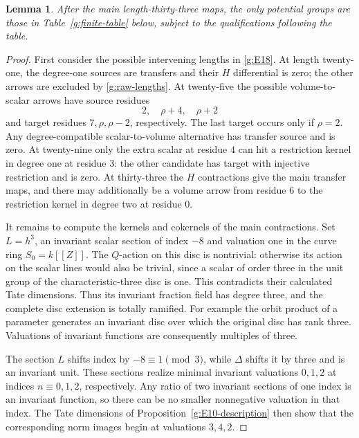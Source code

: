 \documentclass[11pt]{article}
\newtheorem{lemma}[theorem]{Lemma}
\theoremstyle{definition}
\theoremstyle{remark}
\numberwithin{equation}{section}
\begin{document}
\begin{lemma}\label{g:to33}
After the main length-thirty-three maps, the only potential
groups are those in Table~\ref{g:finite-table} below, subject
to the qualifications following the table.
\end{lemma}

\begin{proof}
First consider the possible intervening lengths in
\eqref{g:E18}.  At length twenty-one, the degree-one sources
are transfers and their $H$ differential is zero; the
other arrows are excluded by \eqref{g:raw-lengths}.
At twenty-five the possible volume-to-scalar arrows have
source residues
\[
 2,\quad\rho+4,\quad\rho+2
\]
and target residues $7,\rho,\rho-2$, respectively.
The last target occurs only if $\rho=2$.  Any
degree-compatible scalar-to-volume alternative has
transfer source and is zero.  At twenty-nine only the
extra scalar at residue $4$ can hit a restriction kernel
in degree one at residue $3$: the other candidate has
target with injective restriction and is zero.  At
thirty-three the $H$ contractions give the main transfer
maps, and there may additionally be a volume arrow from
residue $6$ to the restriction kernel in degree two at
residue $0$.

It remains to compute the kernels and cokernels of the
main contractions.  Set $L=h^3$, an invariant scalar
section of index $-8$ and valuation one in the curve
ring $S_0=k[[Z]]$.  The $Q$-action on this disc is
nontrivial: otherwise its action on the scalar lines
would also be trivial, since a scalar of order three
in the unit group of the characteristic-three disc
is one.  This contradicts their calculated Tate
dimensions.  Thus its invariant fraction field has
degree three, and the complete disc extension is
totally ramified.  For example the orbit product of a
parameter generates an invariant disc over which the
original disc has rank three.  Valuations of invariant
functions are consequently multiples of three.

The section $L$ shifts index by $-8\equiv1\pmod3$,
while $\Delta$ shifts it by three and is an invariant
unit.  These sections realize minimal invariant
valuations $0,1,2$ at indices $n\equiv0,1,2$,
respectively.  Any ratio of two invariant sections of
one index is an invariant function, so there can be no
smaller nonnegative valuation in that index.  The Tate
dimensions of Proposition~\ref{g:E10-description}
then show that the corresponding norm images begin at
valuations $3,4,2$.


\end{proof}
\end{document}

